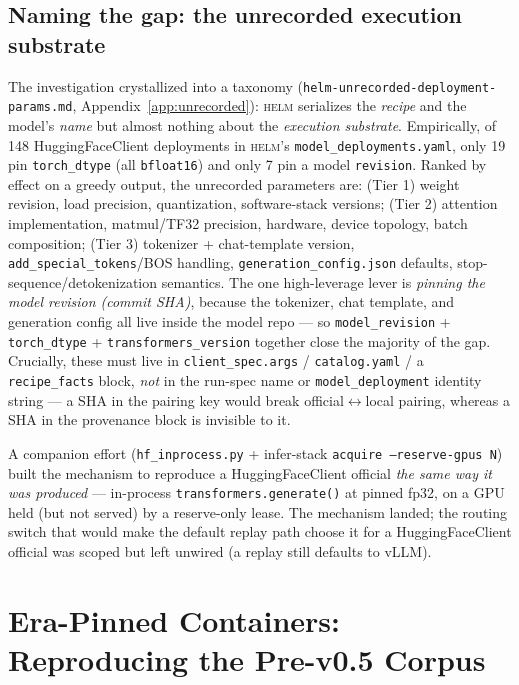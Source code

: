 \documentclass[11pt]{report}
\newcommand{\code}[1]{\texttt{#1}}
\newcommand{\file}[1]{\texttt{#1}}
\begin{document}
\section{Naming the gap: the unrecorded execution substrate}
\label{sec:substrate}

The investigation crystallized into a taxonomy (\file{helm-unrecorded-deployment-
params.md}, Appendix~\ref{app:unrecorded}): \textsc{helm} serializes the
\emph{recipe} and the model's \emph{name} but almost nothing about the
\emph{execution substrate}. Empirically, of 148 HuggingFaceClient deployments in
\textsc{helm}'s \code{model\_deployments.yaml}, only 19 pin \code{torch\_dtype}
(all \code{bfloat16}) and only 7 pin a model \code{revision}. Ranked by effect on a
greedy output, the unrecorded parameters are: (Tier 1) weight revision, load
precision, quantization, software-stack versions; (Tier 2) attention implementation,
matmul/TF32 precision, hardware, device topology, batch composition; (Tier 3)
tokenizer + chat-template version, \code{add\_special\_tokens}/BOS handling,
\code{generation\_config.json} defaults, stop-sequence/detokenization semantics.
The one high-leverage lever is \emph{pinning the model revision (commit SHA)},
because the tokenizer, chat template, and generation config all live inside the
model repo --- so \code{model\_revision} + \code{torch\_dtype} +
\code{transformers\_version} together close the majority of the gap. Crucially,
these must live in \code{client\_spec.args} / \code{catalog.yaml} / a
\code{recipe\_facts} block, \emph{not} in the run-spec name or
\code{model\_deployment} identity string --- a SHA in the pairing key would break
official$\leftrightarrow$local pairing, whereas a SHA in the provenance block is
invisible to it.

A companion effort (\code{hf\_inprocess.py} + infer-stack
\code{acquire --reserve-gpus N}) built the mechanism to reproduce a
HuggingFaceClient official \emph{the same way it was produced} --- in-process
\code{transformers.generate()} at pinned fp32, on a GPU held (but not served) by a
reserve-only lease. The mechanism landed; the routing switch that would make the
default replay path choose it for a HuggingFaceClient official was scoped but left
unwired (a replay still defaults to vLLM).

\chapter{Era-Pinned Containers: Reproducing the Pre-v0.5 Corpus}
\label{chap:eras}
\end{document}

